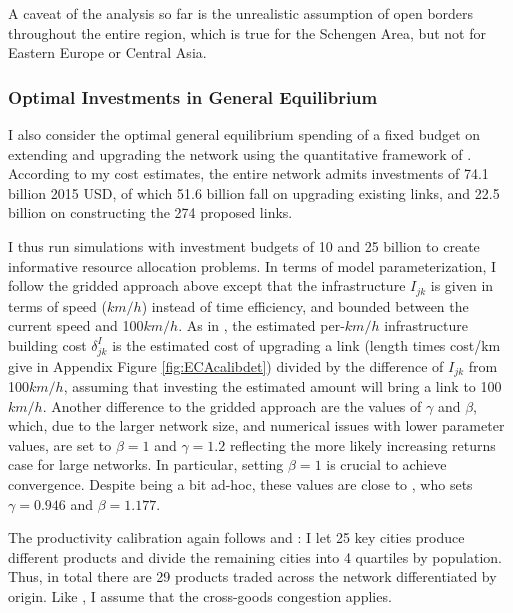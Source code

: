 \documentclass[a4paper]{article}
\begin{document}
A caveat of the analysis so far is the unrealistic assumption of open borders throughout the entire region, which is true for the Schengen Area, but not for Eastern Europe or Central Asia. %

\subsubsection*{Optimal Investments in General Equilibrium}

I also consider the optimal general equilibrium spending of a fixed budget on extending and upgrading the network using the quantitative framework of \citet{fajgelbaum2020optimal}. According to my cost estimates, the entire network admits investments of 74.1 billion 2015 USD, of which 51.6 billion fall on upgrading existing links, and 22.5 billion on constructing the 274 proposed links. \newline 

I thus run simulations with investment budgets of 10 and 25 billion to create informative resource allocation problems. In terms of model parameterization, I follow the gridded approach above except that the infrastructure $I_{jk}$ is given in terms of speed ($km/h$) instead of time efficiency, and bounded between the current speed and 100$km/h$. As in \citet{krantz2024optimal}, the estimated per-$km/h$ infrastructure building cost $\delta^I_{jk}$ is the estimated cost of upgrading a link (length times cost/km give in Appendix Figure \ref{fig:ECAcalibdet}) divided by the difference of $I_{jk}$ from 100$km/h$, assuming that investing the estimated amount will bring a link to 100$km/h$. Another difference to the gridded approach are the values of $\gamma$ and $\beta$, which, due to the larger network size, and numerical issues with lower parameter values, are set to $\beta = 1$ and $\gamma = 1.2$ reflecting the more likely increasing returns case for large networks. In particular, setting $\beta = 1$ is crucial to achieve convergence. Despite being a bit ad-hoc, these values are close to \citet{graff2024spatial}, who sets $\gamma = 0.946$ and $\beta = 1.177$. \newline 

The productivity calibration again follows \citet{armington1969theory} and \citet{fajgelbaum2020optimal}: I let 25 key cities produce different products and divide the remaining cities into 4 quartiles by population. Thus, in total there are 29 products traded across the network differentiated by origin. Like \citet{fajgelbaum2020optimal}, I assume that the cross-goods congestion applies. \newline 
\end{document}
